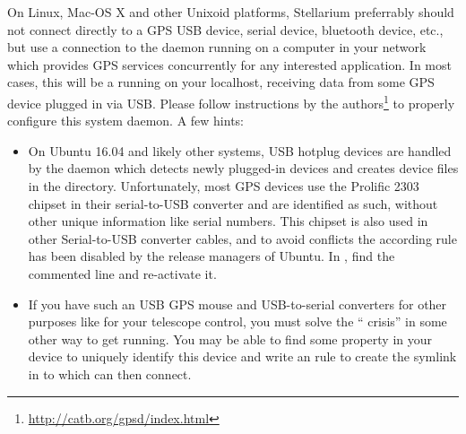 On Linux, Mac-OS X and other Unixoid platforms, Stellarium preferrably
should not connect directly to a GPS USB device, serial device,
bluetooth device, etc., but use a connection to the 
daemon running on a computer in your network which provides GPS
services concurrently for any interested application. In most cases,
this will be a  running on your localhost, receiving
data from some GPS device plugged in via USB.
Please follow instructions by the 
authors\footnote{\url{http://catb.org/gpsd/index.html}} to properly
configure this system daemon.  A few hints:
\begin{itemize}
\item On Ubuntu 16.04 and likely other systems, USB hotplug devices
  are handled by the  daemon which detects newly
  plugged-in devices and creates device files in the 
  directory. Unfortunately, most GPS devices use the Prolific 2303
  chipset in their serial-to-USB converter and are identified as
  such, without other unique information like serial numbers. 
  This chipset is also used in other Serial-to-USB converter
  cables, and to avoid conflicts the according rule has been disabled
  by the release managers of Ubuntu.  In
  , find the commented line and
  re-activate it.

\item If you have such an USB GPS mouse and USB-to-serial converters
  for other purposes like for your telescope control, you must solve
  the `` crisis'' in some other way to get
   running. You may be able to find some property in
  your device to uniquely identify this device and write an
   rule to create the symlink in  to
  which  can then connect.


\end{itemize}
